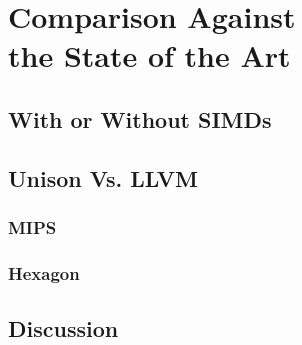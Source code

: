 %

\chapter[Comparison Against the State of the Art]%
        {Comparison Against\\ the State of the Art}

\section{With or Without SIMDs}
\section{Unison Vs. LLVM}
\subsection{MIPS}
\subsection{Hexagon}
\section{Discussion}

